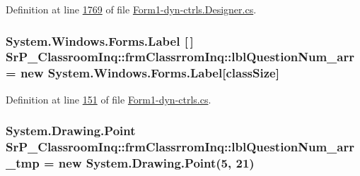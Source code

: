 \-Definition at line \hyperlink{_form1-dyn-ctrls_8_designer_8cs_source_l01769}{1769} of file \hyperlink{_form1-dyn-ctrls_8_designer_8cs_source}{\-Form1-\/dyn-\/ctrls.\-Designer.\-cs}.

\hypertarget{class_sr_p___classroom_inq_1_1frm_classrrom_inq_ae46e928c386c686caa96bfe4f302c2f1}{
\subsubsection[{lbl\-Question\-Num\-\_\-arr}]{\setlength{\rightskip}{0pt plus 5cm}\-System.\-Windows.\-Forms.\-Label \mbox{[}$\,$\mbox{]} {\bf \-Sr\-P\-\_\-\-Classroom\-Inq\-::frm\-Classrrom\-Inq\-::lbl\-Question\-Num\-\_\-arr} = new \-System.\-Windows.\-Forms.\-Label\mbox{[}{\bf class\-Size}\mbox{]}}}
\label{class_sr_p___classroom_inq_1_1frm_classrrom_inq_ae46e928c386c686caa96bfe4f302c2f1}


\-Definition at line \hyperlink{_form1-dyn-ctrls_8cs_source_l00151}{151} of file \hyperlink{_form1-dyn-ctrls_8cs_source}{\-Form1-\/dyn-\/ctrls.\-cs}.

\hypertarget{class_sr_p___classroom_inq_1_1frm_classrrom_inq_a9af0d3cc5171be1c8b01ea1e208d61ee}{
\subsubsection[{lbl\-Question\-Num\-\_\-arr\-\_\-tmp}]{\setlength{\rightskip}{0pt plus 5cm}\-System.\-Drawing.\-Point {\bf \-Sr\-P\-\_\-\-Classroom\-Inq\-::frm\-Classrrom\-Inq\-::lbl\-Question\-Num\-\_\-arr\-\_\-tmp} = new \-System.\-Drawing.\-Point(5, 21)}}
\label{class_sr_p___classroom_inq_1_1frm_classrrom_inq_a9af0d3cc5171be1c8b01ea1e208d61ee}


